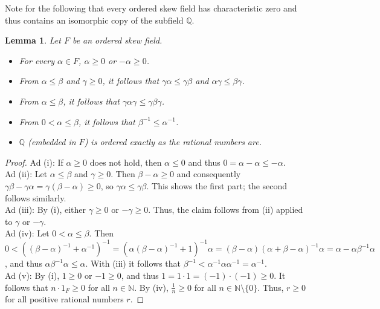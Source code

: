 \documentclass[11pt,a4paper]{article}
\newtheorem{lemma}[theorem]{Lemma}
\begin{document}
Note for the following that every ordered skew field has characteristic zero and thus contains an isomorphic copy of the subfield $\mathbb{Q}$.

\begin{lemma} \label{lem:ordered_skew_field_props}
Let $F$ be an ordered skew field.
\begin{itemize}
    \item[(i)] For every $\alpha \in F$, $\alpha \ge 0$ or $-\alpha \ge 0$.
    \item[(ii)] From $\alpha \le \beta$ and $\gamma \ge 0$, it follows that $\gamma \alpha \le \gamma \beta$ and $\alpha \gamma \le \beta \gamma$.
    \item[(iii)] From $\alpha \le \beta$, it follows that $\gamma \alpha \gamma \le \gamma \beta \gamma$.
    \item[(iv)] From $0 < \alpha \le \beta$, it follows that $\beta^{-1} \le \alpha^{-1}$.
    \item[(v)] $\mathbb{Q}$ (embedded in $F$) is ordered exactly as the rational numbers are.
\end{itemize}
\end{lemma}

\begin{proof}
Ad (i): If $\alpha \ge 0$ does not hold, then $\alpha \le 0$ and thus $0 = \alpha - \alpha \le -\alpha$. \\
Ad (ii): Let $\alpha \le \beta$ and $\gamma \ge 0$. Then $\beta - \alpha \ge 0$ and consequently $\gamma \beta - \gamma \alpha = \gamma(\beta - \alpha) \ge 0$, so $\gamma \alpha \le \gamma \beta$. This shows the first part; the second follows similarly. \\
Ad (iii): By (i), either $\gamma \ge 0$ or $-\gamma \ge 0$. Thus, the claim follows from (ii) applied to $\gamma$ or $-\gamma$. \\
Ad (iv): Let $0 < \alpha \le \beta$. Then $0 < ((\beta - \alpha)^{-1} + \alpha^{-1})^{-1} = (\alpha(\beta - \alpha)^{-1} + 1)^{-1} \alpha = (\beta - \alpha)(\alpha + \beta - \alpha)^{-1} \alpha = \alpha - \alpha \beta^{-1} \alpha$, and thus $\alpha \beta^{-1} \alpha \le \alpha$. With (iii) it follows that $\beta^{-1} < \alpha^{-1} \alpha \alpha^{-1} = \alpha^{-1}$. \\
Ad (v): By (i), $1 \ge 0$ or $-1 \ge 0$, and thus $1 = 1 \cdot 1 = (-1) \cdot (-1) \ge 0$. It follows that $n \cdot 1_F \ge 0$ for all $n \in \mathbb{N}$. By (iv), $\frac{1}{n} \ge 0$ for all $n \in \mathbb{N} \setminus \{0\}$. Thus, $r \ge 0$ for all positive rational numbers $r$.
\end{proof}
\end{document}
